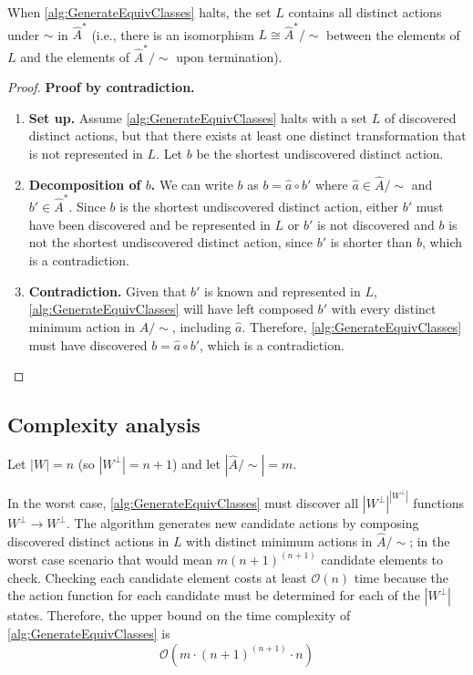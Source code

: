 \begin{proposition}
    When \cref{alg:GenerateEquivClasses} halts, the set $L$ contains all distinct actions under $\sim$ in $\hat{A}^{*}$ (i.e., there is an isomorphism $L \cong \hat{A}^{*}/\sim$ between the elements of $L$ and the elements of $\hat{A}^{*}/\sim$ upon termination).
\end{proposition}
\begin{proof}
\textbf{Proof by contradiction.}
\begin{enumerate}
    \item \textbf{Set up.}
    Assume \cref{alg:GenerateEquivClasses} halts with a set $L$ of discovered distinct actions, but that there exists at least one distinct transformation that is not represented in $L$.
    Let $b$ be the shortest undiscovered distinct action.

    \item \textbf{Decomposition of $b$.}
    We can write $b$ as $b = \hat{a} \circ b'$ where $\hat{a} \in \hat{A}/\sim$ and $b' \in \hat{A}^{\ast}$.
    Since $b$ is the shortest undiscovered distinct action, either $b'$ must have been discovered and be represented in $L$ or $b'$ is not discovered and $b$ is not the shortest undiscovered distinct action, since $b'$ is shorter than $b$, which is a contradiction.

    \item \textbf{Contradiction.}
    Given that $b'$ is known and represented in $L$, \cref{alg:GenerateEquivClasses} will have left composed $b'$ with every distinct minimum action in $\hat{A}/\sim$, including $\hat{a}$.
    Therefore, \cref{alg:GenerateEquivClasses} must have discovered $b = \hat{a} \circ b'$, which is a contradiction.
\end{enumerate}
\end{proof}


\subsection{
Complexity analysis
}

Let $|W| = n$ (so $|W^{\bot}| = n+1$) and let $|\hat{A}/\sim| = m$.

In the worst case, \cref{alg:GenerateEquivClasses} must discover all $|W^{\bot}|^{|W^{\bot}|}$ functions $W^{\bot} \to W^{\bot}$.
The algorithm generates new candidate actions by composing discovered distinct actions in $L$ with distinct minimum actions in $\hat{A}/\sim$; in the worst case scenario that would mean $m (n+1)^{(n+1)}$ candidate elements to check.
Checking each candidate element costs at least $\mathcal{O}(n)$ time because the the action function for each candidate must be determined for each of the $|W^{\bot}|$ states.
Therefore, the upper bound on the time complexity of \cref{alg:GenerateEquivClasses} is
\begin{equation}
    \mathcal{O}(m \cdot (n+1)^{(n+1)} \cdot n)
\end{equation}

